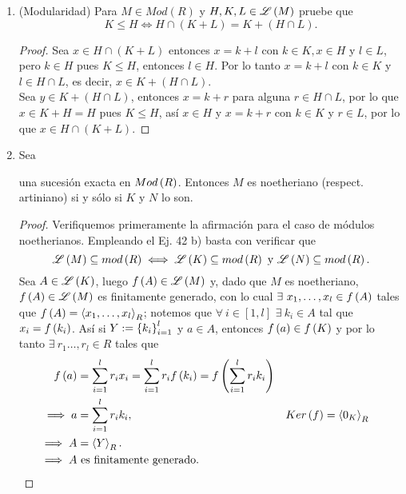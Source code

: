 \documentclass{article}
\begin{document}
\begin{enumerate}[label=\textbf{Ej \arabic*.}]
		\item (Modularidad) Para $M\in Mod(R)$ y $H,K,L\in \mathscr{L}\left(M\right) $ pruebe que 
		\[K\leq H\iff H\cap (K+L)=K+(H\cap L).\]
		\begin{proof}
			Sea $x\in H\cap(K+L)$ entonces $x=k+l$ con $k\in K, x\in H$ y $l\in L$, pero $k\in H$ pues $K\leq H$, entonces $l\in H$. Por lo tanto
			$x=k+l$ con $k\in K$ y $l\in H\cap L$, es decir, $x\in K+(H\cap L)$.\\
			
			Sea $y\in K+(H\cap L)$, entonces $x=k+r$ para alguna $r\in H\cap L$, por lo que $x\in K+H=H$ pues $K\leq H$, así $x\in H$ y $x=k+r$
			con $k\in K$ y $r\in L$, por lo que $x\in H\cap(K+L)$.
		\end{proof}
		
		\item Sea
		\begin{center}
		\end{center} 
		una sucesión exacta en $Mod\left(R\right)$. Entonces $M$ es noetheriano (respect. artiniano) si y sólo si $K$ y $N$ lo son.
		\begin{proof}
			Verifiquemos primeramente la afirmación para el caso de módulos noetherianos. Empleando el Ej. 42 b) basta con verificar que 
			\begin{equation*}
				\mathscr{L}\left(M\right)\subseteq mod\left(R\right)\iff \mathscr{L}\left(K\right)\subseteq mod\left(R\right)\text{ y }\mathscr{L}\left(N\right)\subseteq mod\left(R\right).
			\end{equation*}
			\boxed{\implies} Sea $A\in\mathscr{L}\left(K\right)$, luego $f\left(A\right)\in\mathscr{L}\left(M\right)$ y, dado que $M$ es noetheriano, $f\left(A\right)\in\mathscr{L}\left(M\right)$ es finitamente generado, con lo cual $\exists\ x_1,\dotsc,x_l\in f\lrprth{A}$ tales que $f\left(A\right)=\left< x_1,\dotsc,x_l\right>_{R}$; notemos que $\forall\ i\in[1,l]$ $\exists\ k_i\in A$ tal que $x_i=f\left(k_i\right)$. Así si $Y:={\left\{{k}_{i}\right\}}_{i=1}^{l}$ y $a\in A$, entonces $f\left(a\right)\in f\left(K\right)$ y por lo tanto $\exists\ r_1\dots,r_l\in R$ tales que
			\begin{align*}
				f\lrprth{a}&=\sum_{i=1}^{l}r_ix_i=\sum_{i=1}^{l}r_if\lrprth{k_i}=f\lrprth{\sum_{i=1}^{l}r_ik_i}\\
				\implies a&=\sum_{i=1}^{l}r_ik_i, && Ker\lrprth{f}=\genmod{0_K}{R}\\
				\implies A&=\genmod{Y}{R}.\\
				\implies A&\text{ es finitamente generado}.

\end{align*}
\end{proof}
\end{enumerate}
\end{document}
